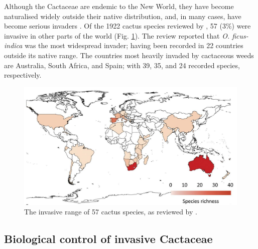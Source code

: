 Although the Cactaceae are endemic to the New World, they have become naturalised widely outside their native distribution, and, in many cases, have become serious invaders \citep{Novoa2015IntroducedReview}. Of the 1922 cactus species reviewed by \citet{Novoa2015IntroducedReview}, 57 (3\%) were invasive in other parts of the world (Fig. \ref{fig:novoaMap}). The review reported that \textit{O. ficus-indica} was the most widespread invader; having been recorded in 22 countries outside its native range. The countries most heavily invaded by cactaceous weeds are Australia, South Africa, and Spain; with 39, 35, and 24 recorded species, respectively.
\vspace{0.4cm}

\begin{figure}[H]
	\centering
	\includegraphics[scale = 0.45]{Images/novoa_map.pdf}
	\caption{The invasive range of 57 cactus species, as reviewed by \citet{Novoa2015IntroducedReview}.}
	\label{fig:novoaMap}
\end{figure}

\subsection{Biological control of invasive Cactaceae}

